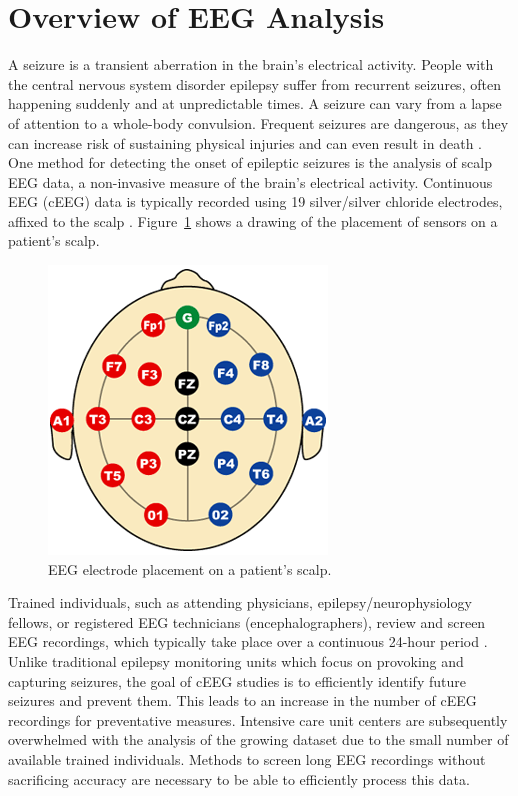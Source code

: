 \section{Overview of EEG Analysis}\label{intro-ch:eeg-overview}

A seizure is a transient aberration in the brain's electrical activity. People
with the central nervous system disorder epilepsy suffer from recurrent
seizures, often happening suddenly and at unpredictable times. A seizure can
vary from a lapse of attention to a whole-body convulsion. Frequent seizures
are dangerous, as they can increase risk of sustaining physical injuries and
can even result in death \cite{eeg-ml}. \\

One method for detecting the onset of epileptic seizures is the analysis of
scalp EEG data, a non-invasive measure of the brain's electrical activity.
Continuous EEG (cEEG) data is typically recorded using 19 silver/silver
chloride electrodes, affixed to the scalp \cite{ceeg-1}.
Figure~\ref{fig:electrodes} shows a drawing of the placement of sensors on a
patient's scalp. \\

\begin{figure}[h]
\begin{center}
\includegraphics[scale=0.5]{./img/electrodes.png}
\caption{EEG electrode placement on a patient's scalp.}
\label{fig:electrodes}
\end{center}
\end{figure}

Trained individuals, such as attending physicians, epilepsy/neurophysiology
fellows, or registered EEG technicians (encephalographers), review and screen
EEG recordings, which typically take place over a continuous 24-hour period
\cite{ceeg-3}. Unlike traditional epilepsy monitoring units which focus on
provoking and capturing seizures, the goal of cEEG studies is to efficiently
identify future seizures and prevent them. This leads to an increase in the
number of cEEG recordings for preventative measures. Intensive care unit
centers are subsequently overwhelmed with the analysis of the growing dataset
due to the small number of available trained individuals. Methods to screen
long EEG recordings without sacrificing accuracy are necessary to be able to
efficiently process this data. \\

